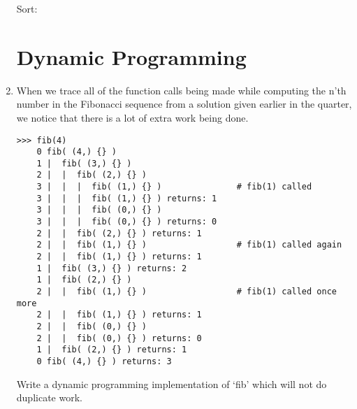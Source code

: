 \documentclass[11pt]{article}
\newenvironment{answer}{\large\lstset{basicstyle=\large}\color{white}}{}
\newenvironment{answer}{\large\lstset{basicstyle=\large}\color{red}}{}
\begin{document}
\begin{enumerate}
\begin{answer}
    	Sort:      \newline
    		[\underline{9}, 7, 5, 3, 3, 2, 1] \newline
    		[9, 7, 5, 3, 3, 2, 1] \newline
    \end{answer}

\section*{Dynamic Programming}

\item When we trace all of the function calls being made while computing the
      n'th number in the Fibonacci sequence from a solution given earlier in
      the quarter, we notice that there is a lot of extra work being done.

      

\begin{verbatim}
>>> fib(4)
    0 fib( (4,) {} )
    1 |  fib( (3,) {} )
    2 |  |  fib( (2,) {} )
    3 |  |  |  fib( (1,) {} )               # fib(1) called
    3 |  |  |  fib( (1,) {} ) returns: 1
    3 |  |  |  fib( (0,) {} )
    3 |  |  |  fib( (0,) {} ) returns: 0
    2 |  |  fib( (2,) {} ) returns: 1
    2 |  |  fib( (1,) {} )                  # fib(1) called again
    2 |  |  fib( (1,) {} ) returns: 1
    1 |  fib( (3,) {} ) returns: 2
    1 |  fib( (2,) {} )
    2 |  |  fib( (1,) {} )                  # fib(1) called once more
    2 |  |  fib( (1,) {} ) returns: 1
    2 |  |  fib( (0,) {} )
    2 |  |  fib( (0,) {} ) returns: 0
    1 |  fib( (2,) {} ) returns: 1
    0 fib( (4,) {} ) returns: 3
\end{verbatim}

      Write a dynamic programming implementation of `fib' which will not do
      duplicate work.


\end{enumerate}
\end{document}
